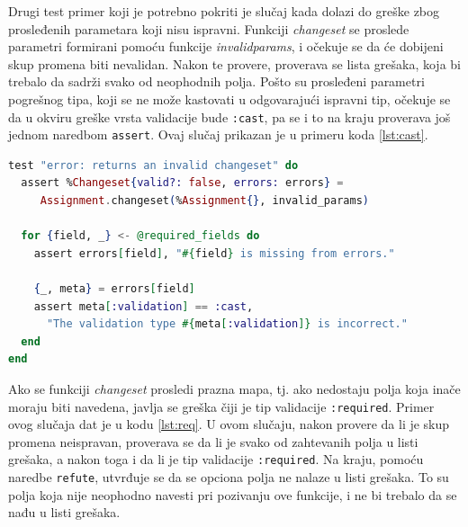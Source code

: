 \documentclass[12pt,oneside]{memoir}
\begin{document}
\par Drugi test primer koji je potrebno pokriti je slučaj kada dolazi do greške zbog prosleđenih parametara koji nisu ispravni. Funkciji \emph{changeset} se proslede parametri formirani pomoću funkcije \emph{invalid{\textunderscore}params}, i očekuje se da će dobijeni skup promena biti nevalidan. Nakon te provere, proverava se lista grešaka, koja bi trebalo da sadrži svako od neophodnih polja. Pošto su prosleđeni parametri pogrešnog tipa, koji se ne može kastovati u odgovarajući ispravni tip, očekuje se da u okviru greške vrsta validacije bude \texttt{:cast}, pa se i to na kraju proverava još jednom naredbom \texttt{assert}. Ovaj slučaj prikazan je u primeru koda \ref{lst:cast}.  \\

\begin{minipage}{\linewidth}
\begin{lstlisting}[language=elixir, basicstyle=\small, caption={Test primer neuspešne upotrebe funkcije \emph{changeset/2}, prosleđivanjem neodgovarajućih parametara},captionpos=b, label={lst:cast}]
test "error: returns an invalid changeset" do
  assert %Changeset{valid?: false, errors: errors} = 
     Assignment.changeset(%Assignment{}, invalid_params)

  for {field, _} <- @required_fields do
    assert errors[field], "#{field} is missing from errors."

    {_, meta} = errors[field]
    assert meta[:validation] == :cast,
      "The validation type #{meta[:validation]} is incorrect."
  end
end
\end{lstlisting}
\end{minipage}

\par Ako se funkciji \emph{changeset} prosledi prazna mapa, tj. ako nedostaju polja koja inače moraju biti navedena, javlja se greška čiji je tip validacije \texttt{:required}. Primer ovog slučaja dat je u kodu \ref{lst:req}. U ovom slučaju, nakon provere da li je skup promena neispravan, proverava se da li je svako od zahtevanih polja u listi grešaka, a nakon toga i da li je tip validacije \texttt{:required}. Na kraju, pomoću naredbe \texttt{refute}, utvrđuje se da se opciona polja ne nalaze u listi grešaka. To su polja koja nije neophodno navesti pri pozivanju ove funkcije, i ne bi trebalo da se nađu u listi grešaka. \\
\end{document}
